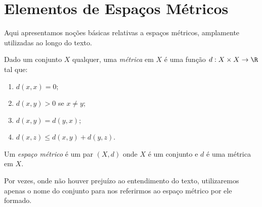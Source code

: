 \section{Elementos de Espaços Métricos}
\label{ap: espacos_metricos}

Aqui apresentamos noções básicas relativas a espaços métricos, amplamente utilizadas ao longo do texto.

\begin{defn}
    Dado um conjunto \( X \) qualquer, uma \emph{métrica} em \( X \) é uma função \( d : X \times X \to \R \) tal que:
    \begin{enumerate}[label=\roman*)]
        \item \( d(x, x) = 0 \);
        \item \( d(x, y) > 0 \) se \( x \neq y \);
        \item \( d(x, y) = d(y, x) \);
        \item \( d(x, z) \leq d(x, y) + d(y, z) \).
    \end{enumerate}
\end{defn}


\begin{defn}
    Um \emph{espaço métrico} é um par \( ( X, d ) \) onde \( X \) é um conjunto e \( d \) é uma métrica em \( X \).
\end{defn}

    Por vezes, onde não houver prejuízo ao entendimento do texto, utilizaremos apenas o nome do conjunto para nos referirmos ao espaço métrico por ele formado.

